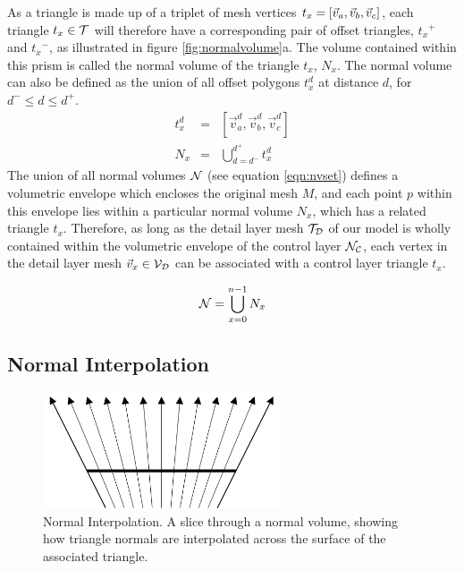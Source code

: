 As a triangle is made up of a triplet of mesh vertices $t_x\symbol{triangle} = [\vec{v}_a,\vec{v}_b,\vec{v}_c]$, each triangle $t_x \in {\cal T}$ will therefore have a corresponding pair of offset triangles, ${t_x}^+$ and ${t_x}^-$, as illustrated in figure \ref{fig:normalvolume}a. The volume contained within this prism is called the normal volume of the triangle $t_x$, $N_x$. The normal volume can also be defined as the union of all offset polygons $t_x^d$ at distance $d$, for $d^- \leq d \leq d^+$.
\begin{eqnarray}
t_x^d & = & [\vec{v}_a^d,\vec{v}_b^d,\vec{v}_c^d] \\
N_x & = & \bigcup^{d^+}_{d=d^-} t_x^d
\end{eqnarray}
The union of all normal volumes ${\cal N}$ (see equation \ref{eqn:nvset}) defines a volumetric envelope which encloses the original mesh $M$, and each point $p$ within this envelope lies within a particular normal volume $N_x$, which has a related triangle $t_x$. Therefore, as long as the detail layer mesh ${\cal T_D}$ of our model is wholly contained within the volumetric envelope of the control layer ${\cal N_C}$, each vertex in the detail layer mesh $\vec{v}_x \in {\cal V_D}$ can be associated with a control layer triangle $t_x$.

\begin{equation} \label{eqn:nvset}
{\cal N} = \bigcup^{n-1}_{x=0} N_x
\end{equation}

\subsection{\label{sec:scandata:normalvolume:interpolation}Normal Interpolation}

\begin{figure}
\begin{center}
\includegraphics[width=7cm]{../images/normals}
\caption[Normal Interpolation]{\label{fig:normalinterpolation} Normal Interpolation. A slice through a normal volume, showing how triangle normals are interpolated across the surface of the associated triangle.}
\end{center}
\end{figure}

